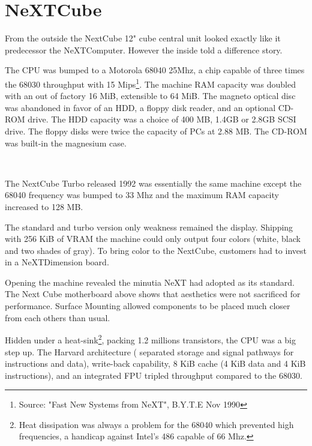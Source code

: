 \section{NeXTCube}
From the outside the NextCube 12" cube central unit looked exactly like it predecessor the NeXTComputer. However the inside told a difference story.\\
\par
 The CPU was bumped to a Motorola 68040 25Mhz, a chip capable of three times the 68030 throughput with 15 Mips\footnote{Source: "Fast New Systems from NeXT", B.Y.T.E Nov 1990}. The machine RAM capacity was doubled with an out of factory 16 MiB, extensible to 64 MiB. The magneto optical disc was abandoned in favor of an HDD, a floppy disk reader, and an optional CD-ROM drive. The HDD capacity was a choice of 400 MB, 1.4GB or 2.8GB SCSI drive. The floppy disks were twice the capacity of PCs at 2.88 MB. The CD-ROM was built-in the magnesium case.\\
\par
\begin{minipage}{\textwidth}
 \\
\end{minipage}

\par
The NextCube Turbo released 1992 was essentially the same machine except the 68040 frequency was bumped to 33 Mhz and the maximum RAM capacity increased to 128 MB.\\
\par
The standard and turbo version only weakness remained the display. Shipping with 256 KiB of VRAM the machine could only output four colors (white, black and two shades of gray). To bring color to the NextCube, customers had to invest in a NeXTDimension board.\\
\par

\pagebreak


\par
Opening the machine revealed the minutia NeXT had adopted as its standard. The Next Cube motherboard above shows that aesthetics were not sacrificed for performance. Surface Mounting allowed components to be placed much closer from each others than usual.\\
\par
Hidden under a heat-sink\footnote{Heat dissipation was always a problem for the 68040 which prevented high frequencies, a handicap against Intel's 486 capable of 66 Mhz.}, packing 1.2 millions transistors, the CPU was a big step up. The Harvard architecture ( separated storage and signal pathways for instructions and data), write-back capability, 8 KiB cache (4 KiB data and 4 KiB instructions), and an integrated FPU tripled throughput compared to the 68030.





